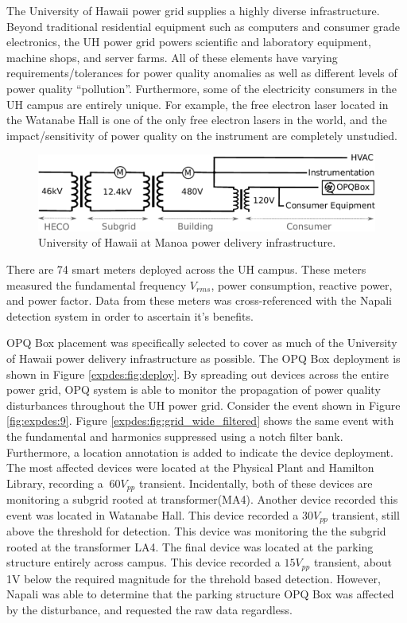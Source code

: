 The University of Hawaii power grid supplies a highly diverse infrastructure.
Beyond traditional residential equipment such as computers and consumer grade electronics, the UH power grid powers scientific and laboratory equipment, machine shops, and server farms.
All of these elements have varying requirements/tolerances for power quality anomalies as well as different levels of power quality ``pollution''.
Furthermore, some of the electricity consumers in the UH campus are entirely unique.
For example, the free electron laser located in the Watanabe Hall is one of the only free electron lasers in the world, and the impact/sensitivity of power quality on the instrument are completely unstudied.
\begin{figure}[ht!]
    \centering
    \includegraphics[width=1\linewidth]{img/uh-grid.pdf}
    \caption{University of Hawaii at Manoa power delivery infrastructure.}
    \label{expdes:fig:1}
\end{figure}

There are 74 smart meters deployed across the UH campus.
These meters measured the fundamental frequency $V_{rms}$, power consumption, reactive power, and power factor.
Data from these meters was cross-referenced with the Napali detection system in order to ascertain it's benefits.

OPQ Box placement was specifically selected to cover as much of the University of Hawaii power delivery infrastructure as possible.
The OPQ Box deployment is shown in Figure \ref{expdes:fig:deploy}.
By spreading out devices across the entire power grid, OPQ system is able to monitor the propagation of power quality disturbances throughout the UH power grid.
Consider the event shown in Figure \ref{fig:expdes:9}.
Figure \ref{expdes:fig:grid_wide_filtered} shows the same event with the fundamental and harmonics suppressed using a notch filter bank.
Furthermore, a location annotation is added to indicate the device deployment.
The most affected devices were located at the Physical Plant and Hamilton Library, recording a $~60V_{pp}$ transient.
Incidentally, both of these devices are monitoring a subgrid rooted at transformer(MA4).
Another device recorded this event was located in Watanabe Hall.
This device recorded a $30V_{pp}$ transient, still above the threshold for detection.
This device was monitoring the the subgrid rooted at the transformer LA4.
The final device was located at the parking structure entirely across campus.
This device recorded a $15V_{pp}$ transient, about 1V below the required magnitude for the threhold based detection.
However, Napali was able to determine that the parking structure OPQ Box was affected by the disturbance, and requested the raw data regardless.

